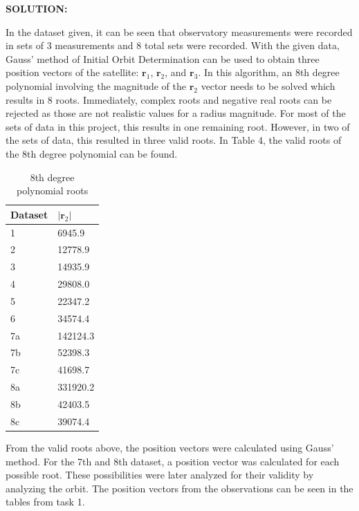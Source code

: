 \documentclass[12pt, letterpaper]{aiaa-tc}
\begin{document}
\begin{enumerate}
    \textbf{SOLUTION:}

    In the dataset given, it can be seen that observatory measurements were recorded in sets of 3 measurements and 8 total sets 
    were recorded. With the given data, Gauss' method of Initial Orbit Determination can be used to obtain three position 
    vectors of the satellite: $\bm{r}_{1}$, $\bm{r}_{2}$, and $\bm{r}_{3}$. In this algorithm, an 8th degree polynomial involving the magnitude of the $\bm{r}_{2}$ vector 
    needs to be solved which results in 8 roots. Immediately, complex roots and negative real roots can be rejected as those are 
    not realistic values for a radius magnitude. For most of the sets of data in this project, this results in one remaining root. However, 
    in two of the sets of data, this resulted in three valid roots. In Table 4, the valid roots of the 8th degree polynomial can be found.
    
    \begin{table}[]
        \centering
        \begin{tabular}{|l|l|}
        \hline
        Dataset & $|\bm{r}_{2}|$ \\ \hline
        1       & 6945.9       \\ \hline
        2       & 12778.9      \\ \hline
        3       & 14935.9      \\ \hline
        4       & 29808.0      \\ \hline
        5       & 22347.2      \\ \hline
        6       & 34574.4      \\ \hline
        7a      & 142124.3     \\ \hline
        7b      & 52398.3      \\ \hline
        7c      & 41698.7      \\ \hline
        8a      & 331920.2     \\ \hline
        8b      & 42403.5      \\ \hline
        8c      & 39074.4      \\ \hline
        \end{tabular}
        \label{8poly}
        \caption{8th degree polynomial roots}
    \end{table}

    From the valid roots above, the position vectors were calculated using Gauss’ method. For the 7th and 8th dataset, a position 
    vector was calculated for each possible root. These possibilities were later analyzed for their validity by analyzing the orbit. 
    The position vectors from the observations can be seen in the tables from task 1.
    

\end{enumerate}
\end{document}
